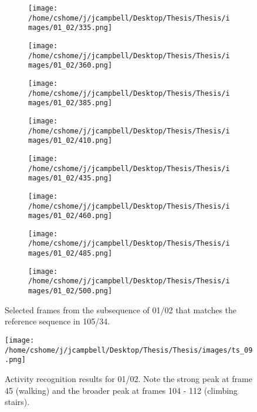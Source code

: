 \begin{figure}
\centering
\begin{subfigure}{0.24\textwidth}
\texttt{[image: /home/cshome/j/jcampbell/Desktop/Thesis/Thesis/images/01\_02/335.png]}
\end{subfigure}
\begin{subfigure}{0.24\textwidth}
\texttt{[image: /home/cshome/j/jcampbell/Desktop/Thesis/Thesis/images/01\_02/360.png]}
\end{subfigure}
\begin{subfigure}{0.24\textwidth}
\texttt{[image: /home/cshome/j/jcampbell/Desktop/Thesis/Thesis/images/01\_02/385.png]}
\end{subfigure}
\begin{subfigure}{0.24\textwidth}
\texttt{[image: /home/cshome/j/jcampbell/Desktop/Thesis/Thesis/images/01\_02/410.png]}
\end{subfigure}

\begin{subfigure}{0.24\textwidth}
\texttt{[image: /home/cshome/j/jcampbell/Desktop/Thesis/Thesis/images/01\_02/435.png]}
\end{subfigure}
\begin{subfigure}{0.24\textwidth}
\texttt{[image: /home/cshome/j/jcampbell/Desktop/Thesis/Thesis/images/01\_02/460.png]}
\end{subfigure}
\begin{subfigure}{0.24\textwidth}
\texttt{[image: /home/cshome/j/jcampbell/Desktop/Thesis/Thesis/images/01\_02/485.png]}
\end{subfigure}
\begin{subfigure}{0.24\textwidth}
\texttt{[image: /home/cshome/j/jcampbell/Desktop/Thesis/Thesis/images/01\_02/500.png]}
\end{subfigure}
\caption{Selected frames from the subsequence of 01/02 that matches the reference sequence in 105/34.\label{01_02}}
\end{figure}

\begin{figure}[h]
\texttt{[image: /home/cshome/j/jcampbell/Desktop/Thesis/Thesis/images/ts\_09.png]}
\caption{Activity recognition results for 01/02. Note the strong peak at frame 45 (walking) and the broader peak at frames 104 - 112 (climbing stairs).\label{ts_09}}
\end{figure}

